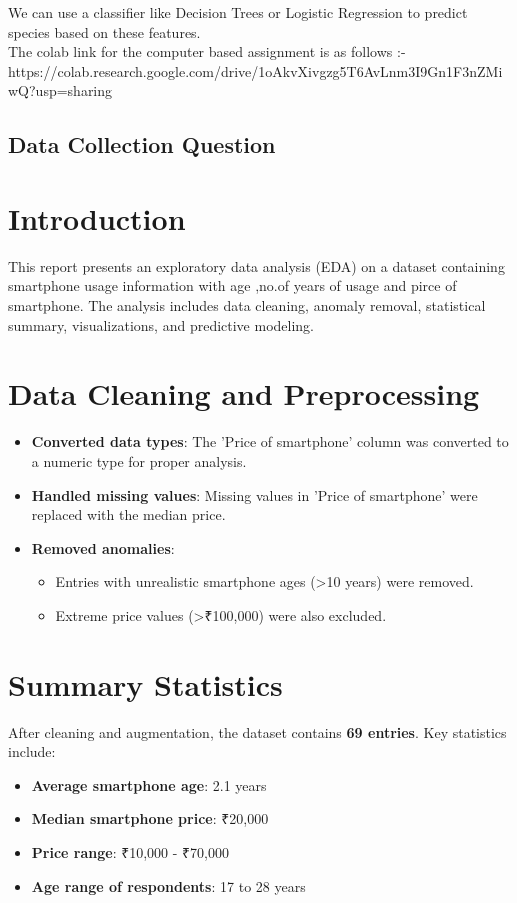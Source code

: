 \documentclass[12pt]{article}
\begin{document}
We can use a classifier like Decision Trees or Logistic Regression to predict species based on these features.\\

The colab link for the computer based assignment is as follows :-\\
https://colab.research.google.com/drive/1oAkvXivgzg5T6AvLnm3I9Gn1F3nZMiwQ?usp=sharing\\

\subsection{Data Collection Question}






\section{Introduction}
This report presents an exploratory data analysis (EDA) on a dataset containing smartphone usage information with age ,no.of years of usage and pirce of smartphone. The analysis includes data cleaning, anomaly removal, statistical summary, visualizations, and predictive modeling.

\section{Data Cleaning and Preprocessing}
\begin{itemize}

\item \textbf{Converted data types}: The 'Price of smartphone' column was converted to a numeric type for proper analysis.
\item \textbf{Handled missing values}: Missing values in 'Price of smartphone' were replaced with the median price.
\item \textbf{Removed anomalies}:
\begin{itemize}
\item Entries with unrealistic smartphone ages (>10 years) were removed.
\item Extreme price values (>₹100,000) were also excluded.
\end{itemize}
\end{itemize}

\section{Summary Statistics}
After cleaning and augmentation, the dataset contains \textbf{69 entries}. Key statistics include:
\begin{itemize}
\item \textbf{Average smartphone age}: 2.1 years
\item \textbf{Median smartphone price}: ₹20,000
\item \textbf{Price range}: ₹10,000 - ₹70,000
\item \textbf{Age range of respondents}: 17 to 28 years
\end{itemize}
\end{document}

